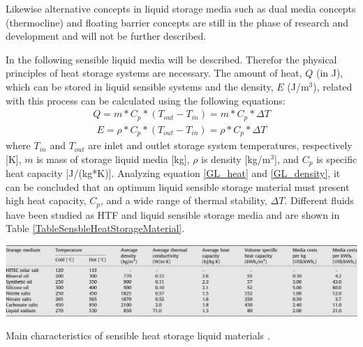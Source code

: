 Likewise alternative concepts in liquid storage media such as dual media concepts (thermocline) and floating barrier concepts are still in the phase of research and development and will not be further described.\cite{Steinmann2015} 



In the following sensible liquid media will be described. Therefor the physical principles of heat storage systems are necessary. The amount of heat, $Q$ (in J), which can be stored in liquid sensible systems and the density, $E$ (J/m$^3$), related with this process can be calculated using the following equations:
\begin{align}
Q=m*C_p*(T_{out}-T_{in})=m*C_p*\Delta T \label{GL_heat}
\end{align}
\begin{align}
E=\rho*C_p*(T_{out}-T_{in})=\rho*C_p*\Delta T \label{GL_density}
\end{align}
where $T_{in}$ and $T_{out}$ are inlet and outlet storage system temperatures, respectively [K], $m$ is mass of storage liquid media [kg], $\rho$ is density [kg/m$^3$], and $C_p$ is specific heat capacity [J/(kg*K)]. Analyzing equation \ref{GL_heat} and \ref{GL_density}, it can be concluded that an optimum liquid sensible storage material must present high heat capacity, $C_p$, and a wide range of thermal stability, $\Delta T$. Different fluids have been studied as HTF and liquid sensible storage media \cite{Gil2010} and are shown in Table \ref{TableSensbleHeatStorageMaterial}. \cite{Ushak2015}
\begin{table}[h]
\centering
\includegraphics[width=1\textwidth]{FIG/TableSensbleHeatStorageMaterial}
\caption[Main characteristics of sensible heat storage liquid materials.]{Main characteristics of sensible heat storage liquid materials \cite{Gil2010}.}\label{TableSensbleHeatStorageMaterial}
\end{table}
